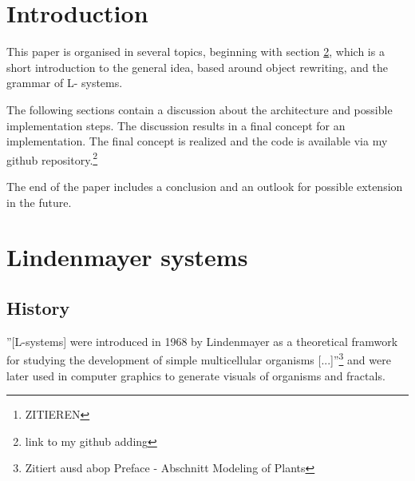 \documentclass[english]{cpp-hmwk}
\begin{document}

\begin{abstract}
Lindenmayer Systems, short L-systems, are the result of \textbf{research from Lindenmayer et al.}\footnote{ZITIEREN} about the geometric features of plants.
L-systems are a concept to mathematicaly/formal describe and model the growth processes of plant development. They are not only restricted to the plant based developments, but can also be used to generate fractals.

L-systems start with a defined state and use rules, like a formal grammar, to transform or rather rewrite the current state to create the next state of the development or the fractal.
It is therefore possible to successive calculate each state of the development of a plant or a fractal.
Such a state of a L-system can be interpreted as commands for a turtle graphic, which creates the opportunity to draw the created fractals or plant states. 

Goal of this paper is to design an architecture for L-systems, which includes an implementation for L-systems, their creation and an interface for a turtle graphic. The interface should enable the polymorphic use of different turtle graphic implementations. 
\end{abstract}

\pagebreak
\section{Introduction}
This paper is organised in several topics, beginning with section \ref{section:lindenmayer}, which is a short introduction to the general idea,  based around object rewriting, and the grammar of L- systems.

The following sections contain a discussion about the architecture and possible implementation steps. The discussion results in a final concept for an implementation.
The final concept is realized and the code is available via my github repository.\footnote{link to my github adding}

The end of the paper includes a conclusion and an outlook for possible extension in the future.

\section{Lindenmayer systems}
\label{section:lindenmayer}
\subsection{History}
''[L-systems] were introduced in 1968 by Lindenmayer as a theoretical framwork for studying the development of simple multicellular organisms [...]''\footnote{Zitiert ausd abop Preface - Abschnitt Modeling of Plants} and were later used in computer graphics to generate visuals of organisms and fractals.
\end{document}
